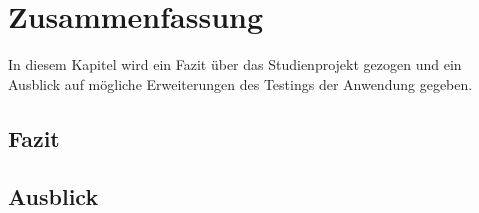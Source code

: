 \chapter{Zusammenfassung}

In diesem Kapitel wird ein Fazit über das Studienprojekt gezogen und ein Ausblick auf mögliche Erweiterungen des Testings der Anwendung gegeben.

\section{Fazit}



\section{Ausblick}



